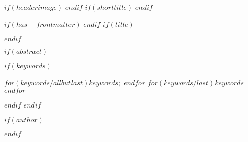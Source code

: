 
\renewcommand{\abstractname}{Abstract.}



\pagestyle{fancy}
\fancyhf{}  %
$if(headerimage)$
$endif$
$if(shorttitle)$
$endif$

$if(has-frontmatter)$
\frontmatter
$endif$
$if(title)$
\maketitle
$endif$



$if(abstract)$
\begin{abstract}
$abstract$
\end{abstract}
$if(keywords)$
\begin{keywords}
\def\sep{;\ }
$for(keywords/allbutlast)$$keywords$\sep $endfor$
$for(keywords/last)$$keywords$$endfor$
\end{keywords}
$endif$
$endif$

$if(author)$
\author{$for(author)$$author.name$$if(author.email)$ \\ \texttt{$author.email$}\par\vspace*{2cm} $endif$$sep$ \and $endfor$}
$endif$




